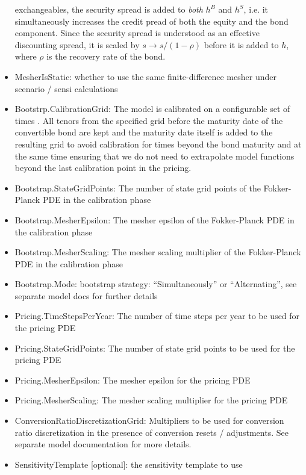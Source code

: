 \begin{itemize}
  exchangeables, the security spread is added to {\em both} $h^B$ and $h^S$, i.e. it simultaneously increases the credit
  pread of both the equity and the bond component. Since the security spread is understood as an effective discounting
  spread, it is scaled by $s \rightarrow s / (1-\rho)$ before it is added to $h$, where $\rho$ is the recovery rate of
  the bond.
\item MesherIsStatic: whether to use the same finite-difference mesher under scenario / sensi calculations
\item Bootstrp.CalibrationGrid: The model is calibrated on a configurable set of times . All tenors from the specified
  grid before the maturity date of the convertible bond are kept and the maturity date itself is added to the resulting
  grid to avoid calibration for times beyond the bond maturity and at the same time ensuring that we do not need to
  extrapolate model functions beyond the last calibration point in the pricing.
\item Bootstrap.StateGridPoints: The number of state grid points of the Fokker-Planck PDE in the calibration phase
\item Bootstrap.MesherEpsilon: The mesher epsilon of the Fokker-Planck PDE in the calibration phase
\item Bootstrap.MesherScaling: The mesher scaling multiplier of the Fokker-Planck PDE in the calibration phase
\item Bootstrap.Mode: bootstrap strategy: ``Simultaneously'' or  ``Alternating'', see separate model docs for further details 
\item Pricing.TimeStepsPerYear: The number of time steps per year to be used for the pricing PDE
\item Pricing.StateGridPoints: The number of state grid points to be used for the pricing PDE
\item Pricing.MesherEpsilon: The mesher epsilon for the pricing PDE
\item Pricing.MesherScaling: The mesher scaling multiplier for the pricing PDE
\item ConversionRatioDiscretizationGrid: Multipliers to be used for conversion ratio discretization in the presence of
  conversion resets / adjustments. See separate model documentation for more details.
\item SensitivityTemplate [optional]: the sensitivity template to use
\end{itemize}

